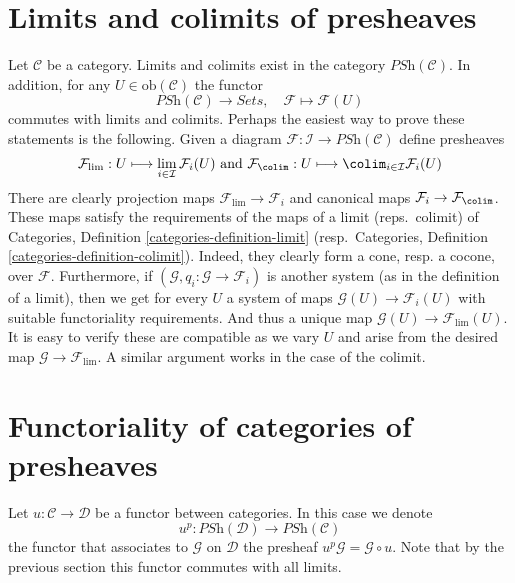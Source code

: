 \section{Limits and colimits of presheaves}
\label{section-limits-colimits-PSh}

\noindent
Let $\mathcal{C}$ be a category.
Limits and colimits exist in the category
$\textit{PSh}(\mathcal{C})$. In addition, for any
$U \in \text{ob}(\mathcal{C})$ the functor
$$
\textit{PSh}(\mathcal{C})
\longrightarrow
\textit{Sets}, \quad
\mathcal{F}
\longmapsto
\mathcal{F}(U)
$$
commutes with limits and colimits. Perhaps the easiest way to prove
these statements is the following. Given a diagram
$
\mathcal{F} :
\mathcal{I}
\to
\textit{PSh}(\mathcal{C})
$
define presheaves
$$
\mathcal{F}_{\lim} :
U
\longmapsto
\lim_{i \in \mathcal{I}} \mathcal{F}_i(U)
\text{  and  }
\mathcal{F}_{\colim} :
U
\longmapsto
\colim_{i \in \mathcal{I}} \mathcal{F}_i(U)
$$
There are clearly projection maps $\mathcal{F}_{\lim} \to \mathcal{F}_i$
and canonical maps $\mathcal{F}_i \to \mathcal{F}_{\colim}$. These
maps satisfy the requirements of the maps of a limit (reps.\ colimit)
of Categories, Definition \ref{categories-definition-limit}
(resp.\ Categories, Definition \ref{categories-definition-colimit}).
Indeed, they clearly form a cone, resp. a cocone, over $\mathcal{F}$.
Furthermore, if $(\mathcal{G}, q_i : \mathcal{G} \to \mathcal{F}_i)$
is another
system (as in the definition of a limit), then we get for every
$U$ a system of maps $\mathcal{G}(U) \to \mathcal{F}_i(U)$
with suitable functoriality requirements. And thus a unique
map $\mathcal{G}(U) \to \mathcal{F}_{\lim}(U)$. It is easy
to verify these are compatible  as we vary $U$ and arise from
the desired map $\mathcal{G} \to \mathcal{F}_{\lim}$.
A similar argument works in the case of the colimit.





















\section{Functoriality of categories of presheaves}
\label{section-functoriality-PSh}

\noindent
Let $u : \mathcal{C} \to \mathcal{D}$ be a functor between categories.
In this case we denote
$$
u^p :
\textit{PSh}(\mathcal{D})
\longrightarrow
\textit{PSh}(\mathcal{C})
$$
the functor that associates to $\mathcal{G}$ on $\mathcal{D}$ the presheaf
$u^p\mathcal{G} = \mathcal{G} \circ u$. Note that by the previous section
this functor commutes with all limits.


